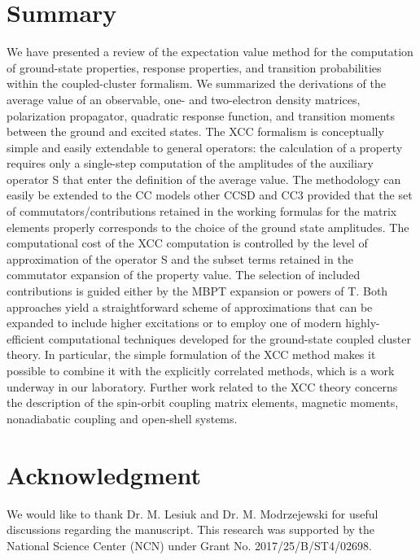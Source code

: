 \documentclass[preprint,12pt]{elsarticle}
\begin{document}
\section{Summary}
We have presented a review of the expectation value method for the computation of ground-state properties, response properties, and transition probabilities within the coupled-cluster formalism. We summarized the derivations of the average value of an observable, one- and two-electron density matrices, polarization propagator, quadratic response function, and transition moments between the ground and excited states. The XCC formalism is conceptually simple and easily extendable to general operators: the calculation of a property requires only a single-step computation of the amplitudes of the auxiliary operator S that enter the definition of the average value. The methodology can easily be extended to the CC models other CCSD and CC3 provided that the set of commutators/contributions retained in the working formulas for the matrix elements properly corresponds to the choice of the ground state amplitudes. The computational cost of the XCC computation is controlled by the level of approximation of the operator S and the subset terms retained in the commutator expansion of the property value. The selection of included contributions is guided either by the MBPT expansion or powers of T. Both approaches yield a straightforward scheme of approximations that can be expanded to include higher excitations or to employ one of modern highly-efficient computational techniques developed for the ground-state coupled cluster theory. In particular, the simple formulation of the XCC method makes it possible to combine it with the explicitly correlated methods, which is a work underway in our laboratory.  Further work related to the XCC theory concerns the description of the spin-orbit coupling matrix elements, magnetic moments, nonadiabatic coupling and open-shell systems. 
\section{Acknowledgment}
We would like to thank Dr. M. Lesiuk and Dr. M. Modrzejewski for useful discussions regarding the manuscript.
 This research was supported by the National Science Center (NCN) under Grant No. 2017/25/B/ST4/02698.


{\footnotesize }
\end{document}
